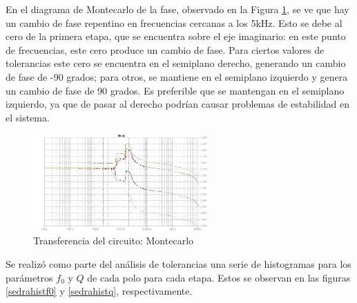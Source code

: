 En el diagrama de Montecarlo de la fase, observado en la Figura \ref{montecarlofase}, se ve que hay un cambio de fase repentino en frecuencias cercanas a los 5kHz. Esto se debe al cero de la primera etapa, que se encuentra sobre el eje imaginario: en este punto de frecuencias, este cero produce un cambio de fase. Para ciertos valores de tolerancias este cero se encuentra en el semiplano derecho, generando un cambio de fase de -90 grados; para otros, se mantiene en el semiplano izquierdo y genera un cambio de fase de 90 grados. Es preferible que se mantengan en el semiplano izquierdo, ya que de pasar al derecho podrían causar problemas de estabilidad en el sistema.

\begin{figure}[H]
    \centering
    \includegraphics[width=0.6\textwidth]{../Ex3/Resources/montecarlofase.png}
    \caption{Transferencia del circuito: Montecarlo}
    \label{montecarlofase}
\end{figure}

Se realizó como parte del análisis de tolerancias una serie de histogramas para los parámetros $f_{0}$ y $Q$ de cada polo para cada etapa. Estos se observan en las figuras \ref{sedrahistf0} y \ref{sedrahistq}, respectivamente.

